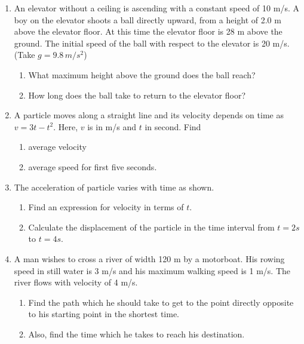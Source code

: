 \documentclass{article}
\begin{document}
\begin{enumerate}
    \item An elevator without a ceiling is ascending with a constant speed of 10 m/s. A boy on the elevator shoots a ball directly upward, from a height of 2.0 m above the elevator floor. At this time the elevator floor is 28 m above the ground. The initial speed of the ball with respect to the elevator is 20 m/s. (Take \( g = 9.8 \, m/s^2 \))
    \begin{enumerate}
        \item What maximum height above the ground does the ball reach?
        \item How long does the ball take to return to the elevator floor?
    \end{enumerate}
    \item A particle moves along a straight line and its velocity depends on time as \( v = 3t - t^2 \). Here, \( v \) is in m/s and \( t \) in second. Find
    \begin{enumerate}
        \item average velocity
        \item average speed for first five seconds.
    \end{enumerate}
    \item The acceleration of particle varies with time as shown.
    \begin{center}
    \end{center}
    \begin{enumerate}
        \item Find an expression for velocity in terms of \( t \).
        \item Calculate the displacement of the particle in the time interval from \( t = 2s \) to \( t = 4s \).
    \end{enumerate}
    \item A man wishes to cross a river of width 120 m by a motorboat. His rowing speed in still water is 3 m/s and his maximum walking speed is 1 m/s. The river flows with velocity of 4 m/s.
    \begin{enumerate}
        \item Find the path which he should take to get to the point directly opposite to his starting point in the shortest time.
        \item Also, find the time which he takes to reach his destination.
    \end{enumerate}

\end{enumerate}
\end{document}
